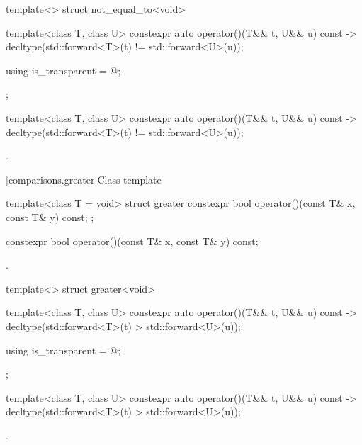 %
\begin{itemdecl}
template<> struct not_equal_to<void> {
  template<class T, class U> constexpr auto operator()(T&& t, U&& u) const
    -> decltype(std::forward<T>(t) != std::forward<U>(u));

  using is_transparent = @\unspec@;
};
\end{itemdecl}

%
\begin{itemdecl}
template<class T, class U> constexpr auto operator()(T&& t, U&& u) const
    -> decltype(std::forward<T>(t) != std::forward<U>(u));
\end{itemdecl}

\begin{itemdescr}
\pnum\returns {}.
\end{itemdescr}

[comparisons.greater]{Class template }

%
\begin{itemdecl}
template<class T = void> struct greater {
  constexpr bool operator()(const T& x, const T& y) const;
};
\end{itemdecl}

%
\begin{itemdecl}
constexpr bool operator()(const T& x, const T& y) const;
\end{itemdecl}

\begin{itemdescr}
\pnum\returns {}.
\end{itemdescr}

%
\begin{itemdecl}
template<> struct greater<void> {
  template<class T, class U> constexpr auto operator()(T&& t, U&& u) const
    -> decltype(std::forward<T>(t) > std::forward<U>(u));

  using is_transparent = @\unspec@;
};
\end{itemdecl}

%
\begin{itemdecl}
template<class T, class U> constexpr auto operator()(T&& t, U&& u) const
    -> decltype(std::forward<T>(t) > std::forward<U>(u));
\end{itemdecl}

\begin{itemdescr}
\pnum\returns {}.
\end{itemdescr}

